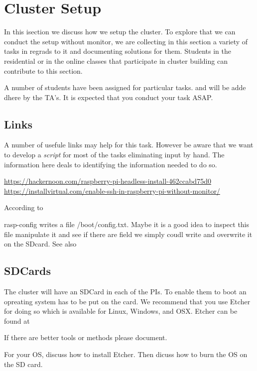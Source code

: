 \chapter{Cluster Setup}

In this isection we discuss how we setup the cluster. To explore that
we can conduct the setup without monitor, we are collecting in this
section a variety of tasks in regrads to it and documenting solutions
for them. Students in the residential or in the online classes that
participate in cluster building can contribute to this section.

A number of students have been assigned for particular tasks. and will
be adde dhere by the TA's. It is expected that you conduct your task ASAP.

\section{Links}

A number of usefule links may help for this task. However be aware
that we want to develop a {\em script} for most of the tasks
eliminating input by hand. The information here deals to identifying
the information needed to do so.

\url{https://hackernoon.com/raspberry-pi-headless-install-462ccabd75d0}
\url{https://installvirtual.com/enable-ssh-in-raspberry-pi-without-monitor/}

According to 


rasp-config writes a file /boot/config.txt. Maybe it is a good idea to
inspect this file manipulate it and see if there are field we simply
coudl write and overwrite it on the SDcard. See also 



\section{SDCards}

The cluster will have an SDCard in each of the PIs. To enable them to
boot an opreating system has to be put on the card. We recommend that
you use Etcher for doing so which is available for Linux, Windows, and
OSX. Etcher can be found at 

If there are better tools or methods please document.

\begin{exercise}
For your OS, discuss how to install Etcher. Then dicuss how to burn
the OS on the SD card. 
\end{exercise}

